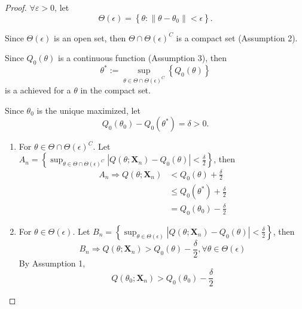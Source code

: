\begin{proof}
    $\forall\varepsilon>0$, let
    \begin{equation*}
        \Theta(\epsilon)=\left\{\theta:\left\|\theta-\theta_{0}\right\|<\epsilon\right\}.
    \end{equation*}

    Since $\Theta(\epsilon)$ is an open set, then $\Theta\cap\Theta(\epsilon)^{C}$ is a compact set (Assumption 2).

    Since $Q_{0}(\theta)$ is a continuous function (Assumption 3), then
    \begin{equation*}
        \theta^{*}:=\sup_{\theta\in\Theta\cap \Theta(\epsilon)^{C}}\left\{Q_{0}(\theta)\right\}
    \end{equation*}
    is a achieved for a $\theta$ in the compact set.

    Since $\theta_{0}$ is the unique maximized, let
    \begin{equation*}
        Q_{0}\left(\theta_{0}\right)-Q_{0}\left(\theta^{*}\right)=\delta>0.
    \end{equation*}

    \begin{enumerate}
        \item For $\theta\in\Theta\cap\Theta(\epsilon)^{C}$. Let $A_n=\left\{\sup_{\theta\in\Theta\cap\Theta(\epsilon)^{C}}\left|Q\left(\theta;\textbf{X}_{n}\right)-Q_{0}(\theta)\right|<\frac{\delta}{2}\right\}$, then
              \begin{equation*}
                  \begin{aligned}
                      A_{n}\Rightarrow Q\left(\theta;\textbf{X}_{n}\right) & <Q_{0}(\theta)+\frac{\delta}{2}                    \\
                                                                           & \leq Q_{0}\left(\theta^{*}\right)+\frac{\delta}{2} \\
                                                                           & = Q_{0}\left(\theta_{0}\right)-\frac{\delta}{2}
                  \end{aligned}
              \end{equation*}
        \item For $\theta\in\Theta(\epsilon)$. Let $B_n=\left\{\sup_{\theta\in\Theta(\epsilon)}\left|Q\left(\theta;\boldsymbol{X}_{n}\right)-Q_{0}(\theta)\right|<\frac{\delta}{2}\right\}$, then
              \begin{equation*}
                  B_{n}\Rightarrow Q\left(\theta;\boldsymbol{X}_{n}\right)>Q_{0}(\theta)-\frac{\delta}{2},\forall\theta\in\Theta(\epsilon)
              \end{equation*}
              By Assumption 1,
              \begin{equation*}
                  Q\left(\theta_{0};\boldsymbol{X}_{n}\right)>Q_{0}\left(\theta_{0}\right)-\frac{\delta}{2}
              \end{equation*}
    \end{enumerate}


\end{proof}
